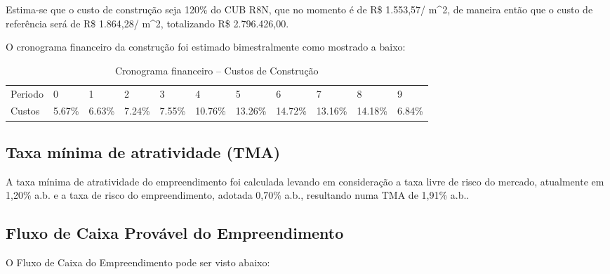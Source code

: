 \documentclass[a4paper]{article}
\begin{document}
Estima-se que o custo de construção seja 120\% do CUB R8N, que no
momento é de R\$ 1.553,57/ m\^{}2, de maneira então que o custo de
referência será de R\$ 1.864,28/ m\^{}2, totalizando R\$ 2.796.426,00.

O cronograma financeiro da construção foi estimado bimestralmente como
mostrado a baixo:

\begin{table}

\caption{\label{tab:wc}Cronograma financeiro -- Custos de Construção}
\centering
\begin{tabular}[t]{lllllllllll}
\toprule
Periodo & 0 & 1 & 2 & 3 & 4 & 5 & 6 & 7 & 8 & 9\\
Custos & 5.67\% & 6.63\% & 7.24\% & 7.55\% & 10.76\% & 13.26\% & 14.72\% & 13.16\% & 14.18\% & 6.84\%\\
\bottomrule
\end{tabular}
\end{table}

\subsection{Taxa mínima de atratividade
(TMA)}\label{taxa-minima-de-atratividade-tma}

A taxa mínima de atratividade do empreendimento foi calculada levando em
consideração a taxa livre de risco do mercado, atualmente em 1,20\% a.b.
e a taxa de risco do empreendimento, adotada 0,70\% a.b., resultando
numa TMA de 1,91\% a.b..

\hypertarget{fluxo-de-caixa-provavel-do-empreendimento}{\subsection{Fluxo
de Caixa Provável do
Empreendimento}\label{fluxo-de-caixa-provavel-do-empreendimento}}

O Fluxo de Caixa do Empreendimento pode ser visto abaixo:

\end{document}
